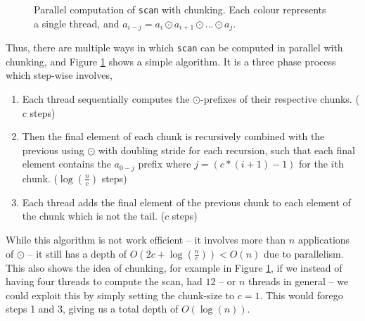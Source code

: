 \documentclass[11pt,bibliography=totocnumbered]{article}
\begin{document}
\begin{figure}[h!]
  
  \caption{Parallel computation of \texttt{scan} with chunking. Each colour represents a single thread, and $a_{i-j} = a_i \odot a_{i+1} \odot ... \odot a_j$.}
  \label{fig:scancomp1}
\end{figure}
Thus, there are multiple ways in which \texttt{scan} can be computed in parallel with chunking, and Figure \ref{fig:scancomp1} shows a simple algorithm.
 It is a three phase process which step-wise involves,
 \begin{enumerate}
 \item Each thread sequentially computes the $\odot$-prefixes of their respective chunks. ($c$ steps)
 \item Then the final element of each chunk is recursively combined with the previous using $\odot$ with
 doubling stride for each recursion, such that each final element contains the $a_{0-j}$ prefix where $j = (c * (i+1) - 1)$ for the
 $i$th chunk. ($\log(\frac{n}{c})$ steps)
 \item Each thread adds the final element of the previous chunk to each element of the chunk
 which is not the tail. ($c$ steps)
 \end{enumerate}
While this algorithm is not work efficient -- it involves more than $n$ applications of $\odot$ -- it still has a depth of $O(2c + \log(\frac{n}{c})) < O(n)$ due to parallelism.
 This also shows the idea of chunking, for example in Figure \ref{fig:scancomp1}, if we instead of having four threads to compute the scan, had $12$ -- or $n$ threads in general -- we
 could exploit this by simply setting the chunk-size to $c = 1$. This would forego steps 1 and 3, giving us a total depth of $O(\log(n))$.
\end{document}
